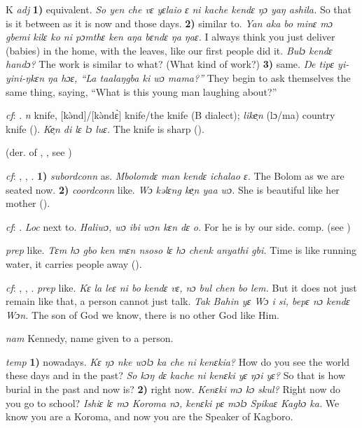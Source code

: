 \begin{letter}{K}
 \textit{adj} \textbf{1)} equivalent. \textit{So yen che vɛ yɛlaio ɛ ni kache kendɛ ŋɔ yaŋ ashila.} So that is it between as it is now and those days. \textbf{2)} similar to. \textit{Yan aka bo minɛ mɔ gbemi kilɛ ko ni pɔmthɛ ken aŋa bɛndɛ ŋa ŋaɛ.} I always think you just deliver (babies) in the home, with the leaves, like our first people did it. \textit{Bulɔ kendɛ handɔ?} The work is similar to what? (What kind of work?) \textbf{3)} same. \textit{Ŋe tipɛ yi-yini-ŋkɛn ŋa hɔɛ, “La taalaŋgba ki wɔ mama?”} They begin to ask themselves the same thing, saying, “What is this young man laughing about?”

 \textit{cf}: . \textit{n} knife, [kə̀nd]/[kə̀ndɛ̀] knife/the knife (B dialect); \textit{like̹n} (lɔ/ma) country knife (\citealt{Pichl1967}). \textit{Ke̹n di lɛ lɔ luɛ.} The knife is sharp (\citealt{Pichl1967}). 

 (der. of , , see ) 

 \textit{cf}: , , . \textbf{1)} \textit{subordconn} as. \textit{Mbolomdɛ man kendɛ ichalao ɛ.} The Bolom as we are seated now. \textbf{2)} \textit{coordconn} like. \textit{Wɔ kəlɛng ke̹n yaa wɔ.} She is beautiful like her mother (\citealt{Pichl1967}).

 \textit{cf}: . \textit{Loc} next to. \textit{Haliwɔ, wɔ ibi wɔn kɛn dɛ o.} For he is by our side. comp.  (see ) 

 \textit{prep} like. \textit{Tɛm hɔ gbo ken mɛn nsoso lɛ hɔ chenk anyathi gbi.} Time is like running water, it carries people away (\citealt{Pichl1967}). 

 \textit{cf}: , , . \textit{prep} like. \textit{Kɛ la leɛ ni bo kendɛ vɛ, nɔ bul chen bo lem.} But it does not just remain like that, a person cannot just talk. \textit{Tak Bahin yɛ Wɔ i si, bepɛ nɔ kendɛ Wɔn.} The son of God we know, there is no other God like Him.

 \textit{nam} Kennedy, name given to a person. 

 \textit{temp} \textbf{1)} nowadays. \textit{Kɛ ŋɔ nke wɔlɔ ka che ni kenɛkia?} How do you see the world these days and in the past? \textit{So kɔŋ dɛ kache ni kenɛki yɛ ŋɔi yɛ?} So that is how burial in the past and now is? \textbf{2)} right now. \textit{Kenɛki mɔ kɔ skul?} Right now do you go to school? \textit{Ishiɛ lɛ mɔ Koroma nɔ, kenɛki pɛ mɔlɔ Spikaɛ Kagbɔ ka.} We know you are a Koroma, and now you are the Speaker of Kagboro.


\end{letter}
